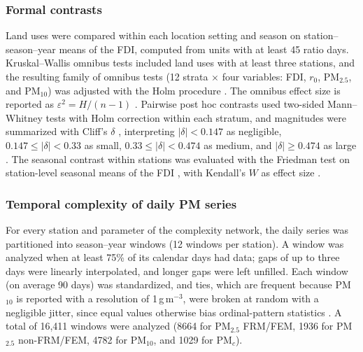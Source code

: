 \documentclass[a4paper,fleqn]{cas-sc}
\begin{document}
\subsubsection{Formal contrasts}

Land uses were compared within each location setting and season on station--season--year means of the FDI, computed from units with at least 45 ratio days. Kruskal--Wallis omnibus tests \citep{Kruskal1952, Lachenbruch1991, MacFarland2016} included land uses with at least three stations, and the resulting family of omnibus tests (12 strata $\times$ four variables: FDI, $r_0$, PM$_{2.5}$, and PM$_{10}$) was adjusted with the Holm procedure \citep{Holm1979}. The omnibus effect size is reported as $\varepsilon^2=H/(n-1)$ \citep{Kelley1935}. Pairwise post hoc contrasts used two-sided Mann--Whitney tests \citep{Mann1947, Nachar2008} with Holm correction within each stratum, and magnitudes were summarized with Cliff's $\delta$ \citep{Cliff1993, Meissel2024}, interpreting $|\delta|<0.147$ as negligible, $0.147\le|\delta|<0.33$ as small, $0.33\le|\delta|<0.474$ as medium, and $|\delta|\ge0.474$ as large \citep{Romano2006}. The seasonal contrast within stations was evaluated with the Friedman test on station-level seasonal means of the FDI \citep{Friedman1937}, with Kendall's $W$ as effect size \citep{Kendall1939}.

\subsubsection{Temporal complexity of daily PM series}

For every station and parameter of the complexity network, the daily series was partitioned into season--year windows (12 windows per station). A window was analyzed when at least 75\% of its calendar days had data; gaps of up to three days were linearly interpolated, and longer gaps were left unfilled. Each window (on average 90 days) was standardized, and ties, which are frequent because PM$_{10}$ is reported with a resolution of 1\,\textmu g\,m$^{-3}$, were broken at random with a negligible jitter, since equal values otherwise bias ordinal-pattern statistics \citep{Zunino2017}. A total of 16{,}411 windows were analyzed (8664 for PM$_{2.5}$ FRM/FEM, 1936 for PM$_{2.5}$ non-FRM/FEM, 4782 for PM$_{10}$, and 1029 for PM$_{c}$).
\end{document}
